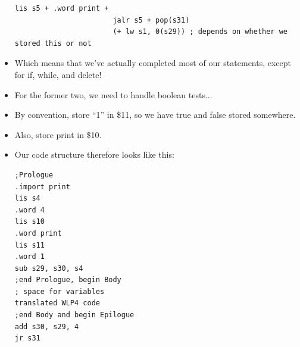 \documentclass[12pt]{article}
\begin{document}
\begin{itemize}
\begin{lstlisting}[mathescape, numbers=none, breaklines=true]
                       lis s5 + .word print +
                       jalr s5 + pop(s31)
                       (+ lw s1, 0(s29)) ; depends on whether we stored this or not
\end{lstlisting}
    \item Which means that we've actually completed most of our statements, except for if, while, and delete!
    \item For the former two, we need to handle boolean tests...
    \item By convention, store ``1'' in \$11, so we have true and false stored somewhere.
    \item Also, store print in \$10.
    \item Our code structure therefore looks like this:
\begin{lstlisting}[mathescape, numbers=none, breaklines=true]
;Prologue
.import print
lis s4
.word 4
lis s10
.word print
lis s11
.word 1
sub s29, s30, s4
;end Prologue, begin Body
; space for variables
translated WLP4 code
;end Body and begin Epilogue
add s30, s29, 4
jr s31
\end{lstlisting}
\end{itemize}
\end{document}
